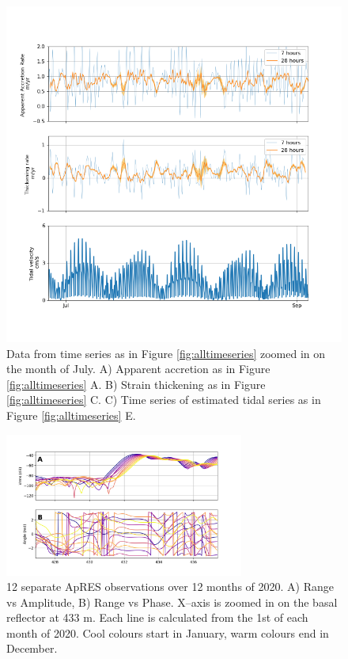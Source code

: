 \begin{figure}[!ht]
\centering
\includegraphics[width=0.7
\textwidth]{chapters/3/zoom_timeseries.png}
\caption[Time series zoomed]{Data from time series as in Figure \ref{fig:alltimeseries} zoomed in on the month of July. A) Apparent accretion as in Figure \ref{fig:alltimeseries} A. B) Strain thickening as in Figure \ref{fig:alltimeseries} C. C) Time series of estimated tidal series as in Figure \ref{fig:alltimeseries} E.  
}
\label{fig:zoom_timeseries}
\end{figure}




\begin{figure}[!ht]
\centering
\includegraphics[width=0.7\textwidth]{chapters/3/range_amp_phase.png}
\caption[Monthly phase and range]{12 separate ApRES observations over 12 months of 2020. A) Range vs Amplitude, B) Range vs Phase. X--axis is zoomed in on the basal reflector at 433 m. Each line is calculated from the 1st of each month of 2020. Cool colours start in January, warm colours end in December. 
}
\label{fig:range_amp_phase}
\end{figure}

